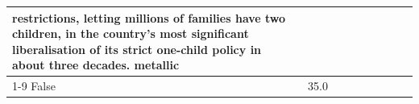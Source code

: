 \begin{table}[H]
\begin{tabular}{lllrlllll}
restrictions, letting millions of families have two children, in the country's most significant liberalisation of its strict one-child policy in about three decades. metallic \\
\cline{1-9}
False & 35.0%
\end{tabular}
\end{table}
